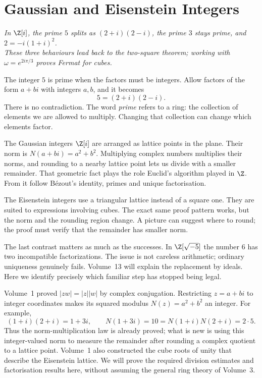 \chapter{Gaussian and Eisenstein Integers}\label{ch:gaussian}

\begin{center}\itshape
In $\Z[i]$, the prime $5$ splits as $(2+i)(2-i)$, the prime $3$ stays prime, and $2=-i(1+i)^2$.\\
These three behaviours lead back to the two-square theorem; working with $\omega=e^{2i\pi/3}$ proves Fermat for cubes.
\end{center}


The integer $5$ is prime when the factors must be integers. Allow factors of the form $a+bi$ with integers $a,b$, and it becomes
\[
5=(2+i)(2-i).
\]
There is no contradiction. The word \emph{prime} refers to a ring: the collection of elements we are allowed to multiply. Changing that collection can change which elements factor.

The Gaussian integers $\Z[i]$ are arranged as lattice points in the plane. Their norm is $N(a+bi)=a^2+b^2$. Multiplying complex numbers multiplies their norms, and rounding to a nearby lattice point lets us divide with a smaller remainder. That geometric fact plays the role Euclid's algorithm played in $\Z$. From it follow Bézout's identity, primes and unique factorisation.

The Eisenstein integers use a triangular lattice instead of a square one. They are suited to expressions involving cubes. The exact same proof pattern works, but the norm and the rounding region change. A picture can suggest where to round; the proof must verify that the remainder has smaller norm.

The last contrast matters as much as the successes. In $\Z[\sqrt{-5}]$ the number $6$ has two incompatible factorizations. The issue is not careless arithmetic; ordinary uniqueness genuinely fails. Volume~13 will explain the replacement by ideals. Here we identify precisely which familiar step has stopped being legal.

\begin{reminder}
Volume~1 proved $|zw|=|z||w|$ by complex conjugation. Restricting
$z=a+bi$ to integer coordinates makes its squared modulus
$N(z)=a^2+b^2$ an integer. For example,
\[
(1+i)(2+i)=1+3i,\qquad N(1+3i)=10
       =N(1+i)N(2+i)=2\cdot5.
\]
Thus the norm-multiplication law is already proved; what is new is
using this integer-valued norm to measure the remainder after rounding a
complex quotient to a lattice point. Volume~1 also constructed the cube
roots of unity that describe the Eisenstein lattice. We will prove
the required division estimates and factorisation results here, without
assuming the general ring theory of Volume~3.
\end{reminder}


